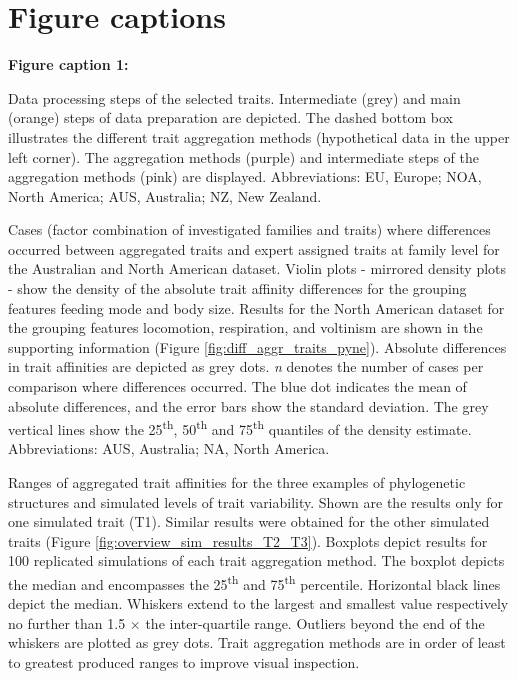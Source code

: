 \documentclass[12pt]{article}
\begin{document}
\section*{Figure captions}

\textbf{Figure caption 1:}

Data processing steps of the selected traits. Intermediate (grey) and main (orange) steps of data preparation are depicted. The dashed bottom box illustrates the different trait aggregation methods (hypothetical data in the upper left corner). The aggregation methods (purple) and intermediate steps of the aggregation methods (pink) are displayed. Abbreviations: EU, Europe; NOA, North America; AUS, Australia; NZ, New Zealand.
\\


Cases (factor combination of investigated families and traits) where differences occurred between aggregated traits and expert assigned traits at family level for the Australian and North American dataset. Violin plots - mirrored density plots - show the density of the absolute trait affinity differences for the grouping features feeding mode and body size. Results for the North American dataset for the grouping features locomotion, respiration, and voltinism are shown in the supporting information (Figure \ref{fig:diff_aggr_traits_pyne}). Absolute differences in trait affinities are depicted as grey dots. \textit{n} denotes the number of cases per comparison where differences occurred. The blue dot indicates the mean of absolute differences, and the error bars show the standard deviation. The grey vertical lines show the 25\textsuperscript{th}, 50\textsuperscript{th} and 75\textsuperscript{th} quantiles of the density estimate. Abbreviations: AUS, Australia; NA, North America.
\\


Ranges of aggregated trait affinities for the three examples of phylogenetic structures and simulated levels of trait variability. Shown are the results only for one simulated trait (T1). Similar results were obtained for the other simulated traits (Figure \ref{fig:overview_sim_results_T2_T3}). Boxplots depict results for 100 replicated simulations of each trait aggregation method. The boxplot depicts the median and encompasses the 25\textsuperscript{th} and 75\textsuperscript{th} percentile. Horizontal black lines depict the median. Whiskers extend to the largest and smallest value respectively no further than 1.5 $\times$ the inter-quartile range. Outliers beyond the end of the whiskers are plotted as grey dots. Trait aggregation methods are in order of least to greatest produced ranges to improve visual inspection.
\\
\end{document}
